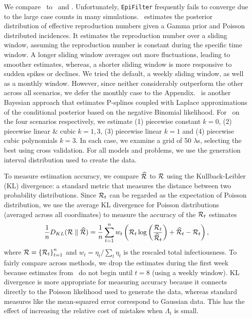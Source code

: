 We compare \RtEstim\ to \EpiEstim\ and \EpiLPS. Unfortunately,
\texttt{EpiFilter} frequently fails to converge due to the large case counts in
many simulations. \EpiEstim\ estimates the posterior distribution of effective
reproduction numbers given a Gamma prior and Poisson distributed incidences. It
estimates the reproduction number over a sliding window, assuming the
reproduction number is constant during the specific time window. A longer
sliding window averages out more fluctuations, leading to smoother estimates,
whereas, a shorter sliding window is more responsive to sudden spikes or
declines. We tried the default, a weekly sliding window, as well as a monthly
window. However, since neither considerably outperform the other across all
scenarios, we defer the monthly case to the Appendix. \EpiLPS\ is another
Bayesian approach that estimates P-splines coupled with Laplace approximations
of the conditional posterior based on the negative Binomial likelihood. For
\RtEstim\ on the four scenarios respectively, we estimate (1) piecewise constant
$k=0$, (2) piecewise linear \& cubic $k=1,3$, (3) piecewise linear $k=1$ and (4)
piecewise cubic polynomials $k=3$. In each case, we examine a grid of 50
$\lambda$s, selecting the best using cross validation. For all models and
problems, we use the generation interval distribution used to create the data. 

To measure estimation accuracy, we compare $\widehat{\mathcal{R}}$ to $\mathcal{R}$ using
the Kullback-Leibler (KL) divergence: a standard metric that measures the
distance between two probability distributions. Since $\mathcal{R}_t$ can be regarded
as the expectation of Poisson distribution, we use the average KL divergence for
Poisson distributions (averaged across all coordinates) to measure the accuracy
of the $\mathcal{R}_t$ estimates $$\frac{1}{n} D_{KL}(\mathcal{R} \parallel \widehat{\mathcal{R}}) = \frac{1}{n}\sum_{t=1}^n w_t \left(\mathcal{R}_t \log\left(\frac{\mathcal{R}_t}
{\widehat{\mathcal{R}}_t}\right) + \widehat{\mathcal{R}}_t - {\mathcal{R}}_t\right),$$ 
where $\mathcal{R} = \left\{ \mathcal{R}_t \right\}_{t=1}^n$ and 
$w_t = \eta_t / \sum_t \eta_t$ is the rescaled total infectiousness.
To fairly compare across methods, we drop the estimates during the first
week because estimates from \EpiEstim\ do not begin until $t=8$ (using a weekly
window). KL divergence is more appropriate for measuring accuracy because it
connects directly to the Poisson likelihood used to generate the data, whereas
standard measures like the mean-squared error correspond to Gaussian data. This
has the effect of increasing the relative cost of mistakes when $\Lambda_t$ is small.


